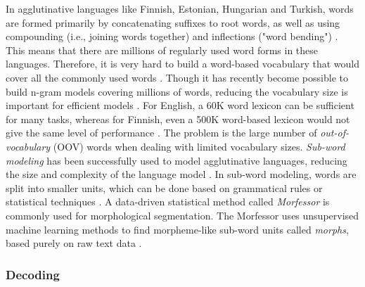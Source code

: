 \documentclass[english, 12pt, a4paper, pdftex, elec, utf8]{aaltothesis}
\begin{document}
In agglutinative languages like Finnish, Estonian, Hungarian and Turkish, words are formed primarily by concatenating suffixes to root words, as well as using compounding (i.e., joining words together) and inflections ("word bending") \cite{arisoy2008statistical, kurimo2006unlimited, hirsimaki2006unlimited}. This means that there are millions of regularly used word forms in these languages. Therefore, it is very hard to build a word-based vocabulary that would cover all the commonly used words \cite{arisoy2008statistical}. Though it has recently become possible to build n-gram models covering millions of words, reducing the vocabulary size is important for efficient models \cite{smit17boundaries}. For English, a 60K word lexicon can be sufficient for many tasks, whereas for Finnish, even a 500K word-based lexicon would not give the same level of performance \cite{arisoy2008statistical}. The problem is the large number of \textit{out-of-vocabulary} (OOV) words when dealing with limited vocabulary sizes. \textit{Sub-word modeling} has been successfully used to model agglutinative languages, reducing the size and complexity of the language model \cite{enarvi2017automatic, hirsimaki2006unlimited, hirsimaki2009importance, smit17boundaries}. In sub-word modeling, words are split into smaller units, which can be done based on grammatical rules or statistical techniques \cite{arisoy2008statistical}. A data-driven statistical method called \textit{Morfessor} is commonly used for morphological segmentation. The Morfessor uses unsupervised machine learning methods to find morpheme-like sub-word units called \textit{morphs}, based purely on raw text data \cite{arisoy2008statistical, kurimo2006unlimited}.

\subsubsection{Decoding} \label{sec:decoding}
\end{document}

